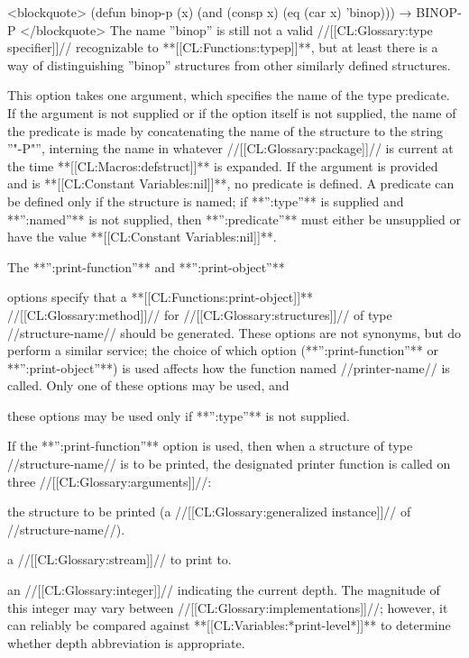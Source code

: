 <blockquote> (defun binop-p (x) (and (consp x) (eq (car x) 'binop))) → BINOP-P </blockquote> The name ''binop'' is still not a valid //[[CL:Glossary:type specifier]]// recognizable to **[[CL:Functions:typep]]**, but at least there is a way of distinguishing ''binop'' structures from other similarly defined structures.


This option takes one argument, which specifies the name of the type predicate. If the argument is not supplied or if the option itself is not supplied, the name of the predicate is made by concatenating the name of the structure to the string ''"-P"'', interning the name in whatever //[[CL:Glossary:package]]// is current at the time **[[CL:Macros:defstruct]]** is expanded. If the argument is provided and is **[[CL:Constant Variables:nil]]**, no predicate is defined. A predicate can be defined only if the structure is named; if **'':type''** is supplied and **'':named''** is not supplied, then **'':predicate''** must either be unsupplied or have the value **[[CL:Constant Variables:nil]]**.


The **'':print-function''** and **'':print-object''**

options specify that a **[[CL:Functions:print-object]]** //[[CL:Glossary:method]]// for //[[CL:Glossary:structures]]// of type //structure-name// should be generated. These options are not synonyms, but do perform a similar service; the choice of which option (**'':print-function''** or **'':print-object''**) is used affects how the function named //printer-name// is called. Only one of these options may be used, and

these options may be used only if **'':type''** is not supplied.

If the **'':print-function''** option is used, then when a structure of type //structure-name// is to be printed, the designated printer function is called on three //[[CL:Glossary:arguments]]//:

\beginlist

\itemitem{--} the structure to be printed (a //[[CL:Glossary:generalized instance]]// of //structure-name//).

\itemitem{--} a //[[CL:Glossary:stream]]// to print to.

\itemitem{--} an //[[CL:Glossary:integer]]// indicating the current depth. The magnitude of this integer may vary between //[[CL:Glossary:implementations]]//; however, it can reliably be compared against **[[CL:Variables:*print-level*]]** to determine whether depth abbreviation is appropriate.


